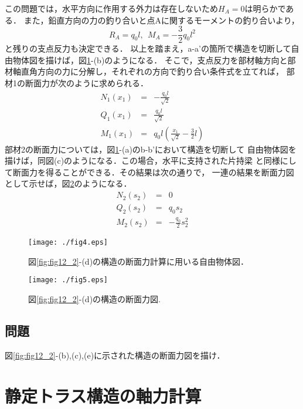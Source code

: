 \documentclass[10pt,a4j]{jarticle}
\begin{document}
この問題では，水平方向に作用する外力は存在しないため$H_A=0$は明らかである．
また，鉛直方向の力の釣り合いと点Aに関するモーメントの釣り合いより，
\begin{equation}
	R_A=q_0l, \ \ M_A=-\frac{3}{2}q_0l^2
\end{equation}
と残りの支点反力も決定できる．
以上を踏まえ，a-a'の箇所で構造を切断して自由物体図を描けば，図\ref{fig:fig12_4}-(b)のようになる．
そこで，支点反力を部材軸方向と部材軸直角方向の力に分解し，それぞれの方向で釣り合い条件式を立てれば，
部材1の断面力が次のように求められる．
\begin{eqnarray}
	N_1(x_1) &= & -\frac{q_0l}{\sqrt{2}} 
	\\
	Q_1(x_1) &= & \frac{q_0l}{\sqrt{2}} 
	\\
	M_1(x_1) &= & q_0l \left( \frac{x_1}{\sqrt{2}}-\frac{3}{2}l\right) 
\end{eqnarray}
部材2の断面力については，図\ref{fig:fig12_4}-(a)のb-b'において構造を切断して
自由物体図を描けば，同図(c)のようになる．この場合，水平に支持された片持梁
と同様にして断面力を得ることができる．その結果は次の通りで，
一連の結果を断面力図として示せば，図\ref{fig:fig12_5}のようになる．
\begin{eqnarray}
	N_2(s_2) &= & 0
	\\
	Q_2(s_2) &= & q_0s_2
	\\
	M_2(s_2) &= & -\frac{q_0}{2}s_2^2
\end{eqnarray}
\begin{figure}[h]
	\begin{center}
	\texttt{[image: ./fig4.eps]} 
	\end{center}
	\caption{
		図\ref{fig:fig12_2}-(d)の構造の断面力計算に用いる自由物体図．
	} 
	\label{fig:fig12_4}
\end{figure}
\begin{figure}[h]
	\begin{center}
	\texttt{[image: ./fig5.eps]} 
	\end{center}
	\caption{
		図\ref{fig:fig12_2}-(d)の構造の断面力図.
	} 
	\label{fig:fig12_5}
\end{figure}
\subsection{問題}
図\ref{fig:fig12_2}-(b),(c),(e)に示された構造の断面力図を描け．
\section{静定トラス構造の軸力計算}
\end{document}
